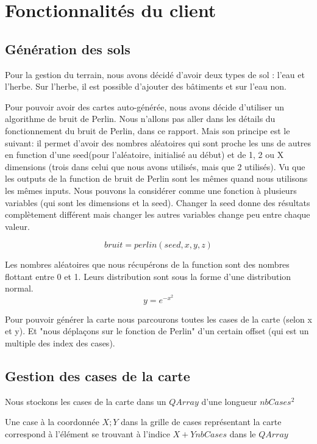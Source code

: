 \documentclass[a4paper,10pt,openany,oneside]{report}
\begin{document}
\section{Fonctionnalités du client}
\subsection{Génération des sols}
Pour la gestion du terrain, nous avons décidé d'avoir deux types de sol : l'eau et l'herbe. Sur l'herbe, il est possible d'ajouter des bâtiments et sur l'eau non.

Pour pouvoir avoir des cartes auto-générée, nous avons décide d'utiliser un algorithme de bruit de Perlin. Nous n'allons pas aller dans les détails du fonctionnement du bruit de Perlin, dans ce rapport. Mais son principe est le suivant: il permet d'avoir des nombres aléatoires qui sont proche les uns de autres en function d'une seed(pour l'aléatoire, initialisé au début) et de 1, 2 ou X dimensions (trois dans celui que nous avons utilisés, mais que 2 utilisés). Vu que les outputs de la function de bruit de Perlin sont les mêmes quand nous utilisons les mêmes inputs. Nous pouvons la considérer comme une fonction à plusieurs variables (qui sont les dimensions et la seed). Changer la seed donne des résultats complètement différent mais changer les autres variables change peu entre chaque valeur.

\[bruit = perlin(seed, x, y, z)\]

Les nombres aléatoires que nous récupérons de la function sont des nombres flottant entre 0 et 1.
Leurs distribution sont sous la forme d'une distribution normal.
\[y=e^{-x^{2}}\]

Pour pouvoir générer la carte nous parcourons toutes les cases de la carte (selon x et y). Et "nous déplaçons sur le fonction de Perlin" d'un certain offset (qui est un multiple des index des cases).
\subsection{Gestion des cases de la carte}
Nous stockons les cases de la carte dans un $QArray$ d'une longueur $nbCases^{2}$

Une case à la coordonnée $X;Y$ dans la grille de cases représentant la carte correspond à l'élément se trouvant à l'indice $X+Y nbCases$ dans le $QArray$
\end{document}
